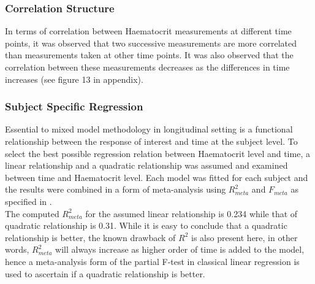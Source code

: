 \documentclass[11pt]{article}
\begin{document}
\subsubsection{Correlation Structure}
In terms of correlation between Haematocrit measurements at different time points, it was observed that two successive measurements are more correlated than measurements taken at other time points. It was also observed that the correlation between these measurements decreases as the differences in time increases (see figure 13 in appendix).

\subsubsection{Subject Specific Regression}
Essential to mixed model methodology in longitudinal setting is a functional relationship between the response of interest and time at the subject level. To select the best possible regression relation between Haematocrit level and time, a linear relationship and a quadratic relationship was assumed and examined between time and Haematocrit level. Each model was fitted for each subject and the results were combined in a form of meta-analysis using $R^{2}_{meta}$ and $F_{meta}$ as specified in \cite{bib2}.\\

The computed $R^{2}_{meta}$ for the assumed linear relationship is 0.234 while that of quadratic relationship is 0.31. While it is easy to conclude that a quadratic relationship is better, the known drawback of $R^2$ is also present here, in other words, $R^{2}_{meta}$ will always increase as higher order of time is added to the model, hence a meta-analysis form of the partial F-test in classical linear regression is used to ascertain if a quadratic relationship is better.
\end{document}
